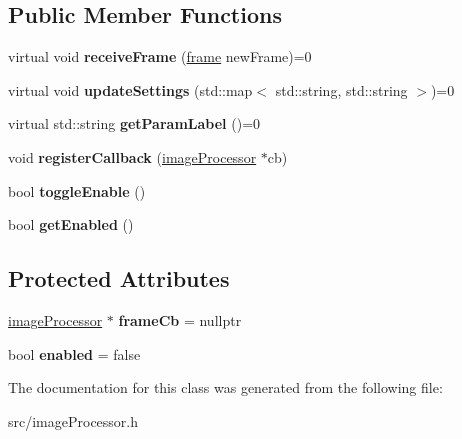 \subsection*{Public Member Functions}
\begin{DoxyCompactItemize}
\item 
virtual void {\bfseries receive\+Frame} (\hyperlink{classframe}{frame} new\+Frame)=0\hypertarget{classimage_processor_a9bf1827b19fcf2d032efd493151c3b5b}{}\label{classimage_processor_a9bf1827b19fcf2d032efd493151c3b5b}

\item 
virtual void {\bfseries update\+Settings} (std\+::map$<$ std\+::string, std\+::string $>$)=0\hypertarget{classimage_processor_af0e1b504003b23c4797acb105faa4aa3}{}\label{classimage_processor_af0e1b504003b23c4797acb105faa4aa3}

\item 
virtual std\+::string {\bfseries get\+Param\+Label} ()=0\hypertarget{classimage_processor_a51607435507ae4ff7ecb00ed98f08624}{}\label{classimage_processor_a51607435507ae4ff7ecb00ed98f08624}

\item 
void {\bfseries register\+Callback} (\hyperlink{classimage_processor}{image\+Processor} $\ast$cb)\hypertarget{classimage_processor_af3c9e1ed9e62fe3f714a2c637951dc0f}{}\label{classimage_processor_af3c9e1ed9e62fe3f714a2c637951dc0f}

\item 
bool {\bfseries toggle\+Enable} ()\hypertarget{classimage_processor_a7570b72f296fce91a86baf55d2ffc06a}{}\label{classimage_processor_a7570b72f296fce91a86baf55d2ffc06a}

\item 
bool {\bfseries get\+Enabled} ()\hypertarget{classimage_processor_a00e2d512096a68f1c3a0866cb7e82d8b}{}\label{classimage_processor_a00e2d512096a68f1c3a0866cb7e82d8b}

\end{DoxyCompactItemize}
\subsection*{Protected Attributes}
\begin{DoxyCompactItemize}
\item 
\hyperlink{classimage_processor}{image\+Processor} $\ast$ {\bfseries frame\+Cb} = nullptr\hypertarget{classimage_processor_a801f1161fd1e94909f93f45fd3391592}{}\label{classimage_processor_a801f1161fd1e94909f93f45fd3391592}

\item 
bool {\bfseries enabled} = false\hypertarget{classimage_processor_a7d225220555118bc37633cfe8740ae0e}{}\label{classimage_processor_a7d225220555118bc37633cfe8740ae0e}

\end{DoxyCompactItemize}


The documentation for this class was generated from the following file\+:\begin{DoxyCompactItemize}
\item 
src/image\+Processor.\+h\end{DoxyCompactItemize}
